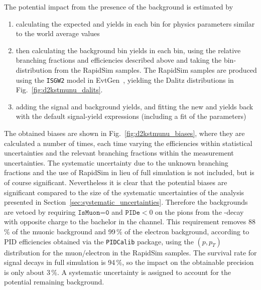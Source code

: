 The potential impact from the presence of the background is estimated by 
\begin{enumerate}
    \item calculating the expected \BtoDpi and \BtoDK yields in each bin for physics parameters similar to the world average values
    \item then calculating the background bin yields in each bin, using the relative branching fractions and efficiencies described above and taking the bin-distribution from the RapidSim samples. The RapidSim samples are produced using the \texttt{ISGW2} model in EvtGen~\cite{EvtGen}, yielding the Dalitz distributions in Fig.~\ref{fig:d2kstmunu_dalits}.
    \item adding the signal and background yields, and fitting the new \BtoDpi and \BtoDK yields back with the default signal-yield expressions (including a fit of the \Fi parameters)
\end{enumerate}
The obtained biases are shown in Fig.~\ref{fig:d2kstmunu_biases}, where they are calculated a number of times, each time varying the efficiencies within statistical uncertainties and the relevant branching fractions within the measurement uncertainties. The  systematic uncertainty due to the unknown branching fractions and the use of RapidSim in lieu of full simulation is not included, but is of course significant. Nevertheless it is clear that the potential biases are significant compared to the size of the systematic uncertainties of the analysis presented in Section~\ref{sec:systematic_uncertainties}. Therefore the backgrounds are vetoed by requiring $\texttt{IsMuon=0}$ and $\texttt{PIDe} < 0$ on the pions from the \D-decay with opposite charge to the bachelor in the \DtoKspipi channel. This requirement removes 88\,\% of the muonic background and 99\,\% of the electron background, according to PID efficiencies obtained via the  \texttt{PIDCalib} package, using the $(p, p_T)$ distribution for the muon/electron in the RapidSim samples. The survival rate for signal decays in full simulation is 94\,\%, so the impact on the obtainable precision is only about $3\,\%$. A systematic uncertainty is assigned to account for the potential remaining background.

